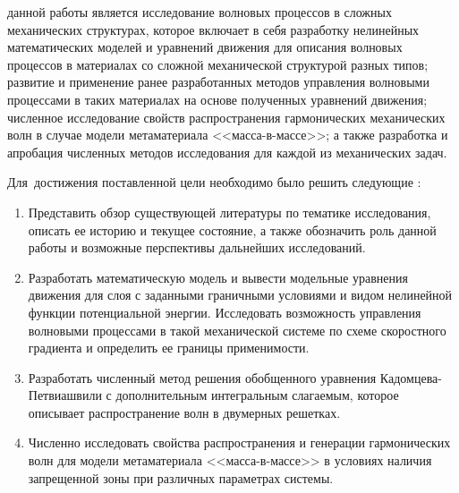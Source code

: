 
{\aim} данной работы является исследование волновых процессов в сложных механических структурах, которое включает в себя разработку нелинейных математических моделей и уравнений движения для описания волновых процессов в материалах со сложной механической структурой разных типов; развитие и применение ранее разработанных методов управления волновыми процессами в таких материалах на основе полученных уравнений движения; численное исследование свойств распространения гармонических механических волн в случае модели метаматериала <<масса-в-массе>>; а также разработка и апробация численных методов исследования для каждой из механических задач.

Для~достижения поставленной цели необходимо было решить следующие {\tasks}:
\begin{enumerate}[beginpenalty=10000] %
  \item {Представить обзор существующей литературы по тематике исследования, описать ее историю и текущее состояние, а также обозначить роль данной работы и возможные перспективы дальнейших исследований.}
  \item {Разработать математическую модель и вывести модельные уравнения движения для слоя с заданными граничными условиями и видом нелинейной функции потенциальной энергии. Исследовать возможность управления волновыми процессами в такой механической системе по схеме скоростного градиента и определить ее границы применимости.}
  \item {Разработать численный метод решения обобщенного уравнения Кадомцева-Петвиашвили с дополнительным интегральным слагаемым, которое описывает распространение волн в двумерных решетках.}
  \item {Численно исследовать свойства распространения и генерации гармонических волн для модели метаматериала <<масса-в-массе>> в условиях наличия запрещенной зоны при различных параметрах системы.}
\end{enumerate}


